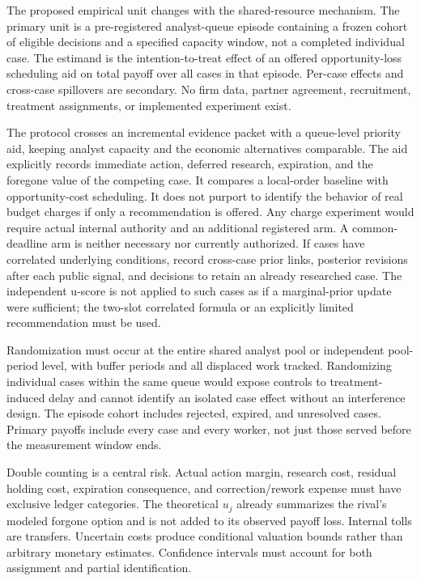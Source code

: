 \documentclass[
  11pt,
]{article}
\begin{document}
The proposed empirical unit changes with the shared-resource mechanism.
The primary unit is a pre-registered analyst-queue episode containing a
frozen cohort of eligible decisions and a specified capacity window, not
a completed individual case. The estimand is the intention-to-treat
effect of an offered opportunity-loss scheduling aid on total payoff
over all cases in that episode. Per-case effects and cross-case
spillovers are secondary. No firm data, partner agreement, recruitment,
treatment assignments, or implemented experiment exist.

The protocol crosses an incremental evidence packet with a queue-level
priority aid, keeping analyst capacity and the economic alternatives
comparable. The aid explicitly records immediate action, deferred
research, expiration, and the foregone value of the competing case. It
compares a local-order baseline with opportunity-cost scheduling. It
does not purport to identify the behavior of real budget charges if only
a recommendation is offered. Any charge experiment would require actual
internal authority and an additional registered arm. A common-deadline
arm is neither necessary nor currently authorized. If cases have
correlated underlying conditions, record cross-case prior links,
posterior revisions after each public signal, and decisions to retain an
already researched case. The independent u-score is not applied to such
cases as if a marginal-prior update were sufficient; the two-slot
correlated formula or an explicitly limited recommendation must be used.

Randomization must occur at the entire shared analyst pool or
independent pool-period level, with buffer periods and all displaced
work tracked. Randomizing individual cases within the same queue would
expose controls to treatment-induced delay and cannot identify an
isolated case effect without an interference design. The episode cohort
includes rejected, expired, and unresolved cases. Primary payoffs
include every case and every worker, not just those served before the
measurement window ends.

Double counting is a central risk. Actual action margin, research cost,
residual holding cost, expiration consequence, and correction/rework
expense must have exclusive ledger categories. The theoretical \(u_j\)
already summarizes the rival's modeled forgone option and is not added
to its observed payoff loss. Internal tolls are transfers. Uncertain
costs produce conditional valuation bounds rather than arbitrary
monetary estimates. Confidence intervals must account for both
assignment and partial identification.
\end{document}
